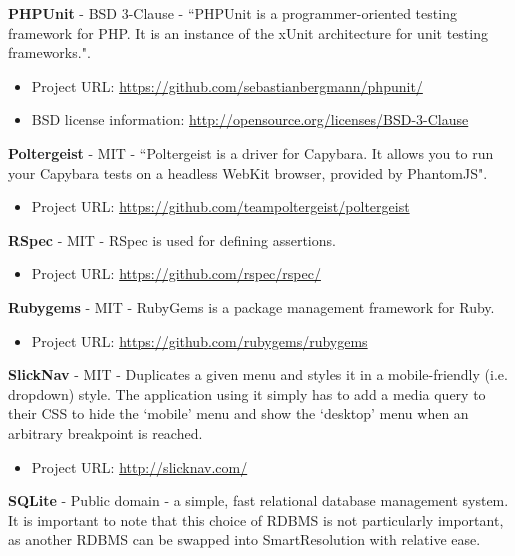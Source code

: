 \textbf{PHPUnit} - BSD 3-Clause - ``PHPUnit is a programmer-oriented testing framework for PHP. It is an instance of the xUnit architecture for unit testing frameworks.".

\begin{itemize}
\item Project URL: \url{https://github.com/sebastianbergmann/phpunit/}
\item BSD license information: \url{http://opensource.org/licenses/BSD-3-Clause}
\end{itemize}

\textbf{Poltergeist} - MIT - ``Poltergeist is a driver for Capybara. It allows you to run your Capybara tests on a headless WebKit browser, provided by PhantomJS".

\begin{itemize}
\item Project URL: \url{https://github.com/teampoltergeist/poltergeist}
\end{itemize}

\textbf{RSpec} - MIT - RSpec is used for defining assertions.

\begin{itemize}
\item Project URL: \url{https://github.com/rspec/rspec/}
\end{itemize}

\textbf{Rubygems} - MIT - RubyGems is a package management framework for Ruby.

\begin{itemize}
\item Project URL: \url{https://github.com/rubygems/rubygems}
\end{itemize}

\textbf{SlickNav} - MIT - Duplicates a given menu and styles it in a mobile-friendly (i.e. dropdown) style. The application using it simply has to add a media query to their CSS to hide the `mobile' menu and show the `desktop' menu when an arbitrary breakpoint is reached.

\begin{itemize}
\item Project URL: \url{http://slicknav.com/}
\end{itemize}

\textbf{SQLite} - Public domain - a simple, fast relational database management system. It is important to note that this choice of RDBMS is not particularly important, as another RDBMS can be swapped into SmartResolution with relative ease.

